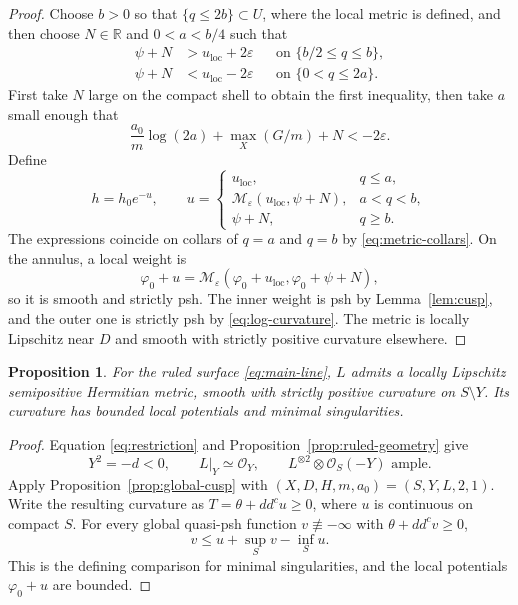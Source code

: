 \documentclass[11pt]{amsart}
\newtheorem{proposition}[theorem]{Proposition}
\theoremstyle{definition}
\theoremstyle{remark}
\numberwithin{equation}{section}
\newcommand{\R}{\mathbb R}
\newcommand{\OO}{\mathcal O}
\newcommand{\ddc}{dd^c}
\begin{document}
\begin{proof}
Choose $b>0$ so that $\{q\le2b\}\subset U$, where the local
metric is defined, and then choose $N\in\R$ and $0<a<b/4$
such that
\begin{equation}\label{eq:metric-collars}
 \begin{aligned}
 \psi+N&>u_{\mathrm{loc}}+2\varepsilon
       &&\text{on }\{b/2\le q\le b\},\\
 \psi+N&<u_{\mathrm{loc}}-2\varepsilon
       &&\text{on }\{0<q\le2a\}.
 \end{aligned}
\end{equation}
First take $N$ large on the compact shell to obtain the first
inequality, then take $a$ small enough that
\[
 \frac{a_0}{m}\log(2a)+\max_X(G/m)+N<-2\varepsilon.
\]
Define
\begin{equation}\label{eq:global-metric}
 h=h_0e^{-u},\qquad
 u=\begin{cases}
 u_{\mathrm{loc}},&q\le a,\\
 \mathcal M_\varepsilon(u_{\mathrm{loc}},\psi+N),&a<q<b,\\
 \psi+N,&q\ge b.
 \end{cases}
\end{equation}
The expressions coincide on collars of $q=a$ and $q=b$ by
\eqref{eq:metric-collars}. On the annulus, a local weight is
\[
 \varphi_0+u=\mathcal M_\varepsilon
  (\varphi_0+u_{\mathrm{loc}},\varphi_0+\psi+N),
\]
so it is smooth and strictly psh. The inner weight is psh by
Lemma~\ref{lem:cusp}, and the outer one is strictly psh by
\eqref{eq:log-curvature}. The metric is locally Lipschitz near
$D$ and smooth with strictly positive curvature elsewhere.
\end{proof}

\begin{proposition}\label{prop:continuous-metric}\label{sec:global}
For the ruled surface \eqref{eq:main-line}, $L$ admits a locally
Lipschitz semipositive Hermitian metric, smooth with strictly
positive curvature on $S\setminus Y$. Its curvature has bounded
local potentials and minimal singularities.
\end{proposition}
\begin{proof}
Equation \eqref{eq:restriction} and
Proposition~\ref{prop:ruled-geometry} give
\[
 Y^2=-d<0,\qquad L|_Y\simeq\OO_Y,\qquad
 L^{\otimes2}\otimes\OO_S(-Y)\text{ ample}.
\]
Apply Proposition~\ref{prop:global-cusp} with
$(X,D,H,m,a_0)=(S,Y,L,2,1)$. Write the resulting curvature as
$T=\theta+\ddc u\ge0$, where $u$ is continuous on compact $S$.
For every global quasi-psh function $v\not\equiv-\infty$ with
$\theta+\ddc v\ge0$,
\[
 v\le u+\sup_Sv-\inf_Su.
\]
This is the defining comparison for minimal singularities, and
the local potentials $\varphi_0+u$ are bounded.
\end{proof}
\end{document}
